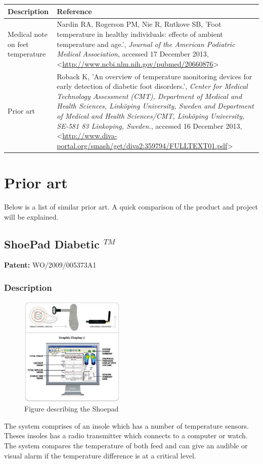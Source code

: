 \begin{table}[H]
\centering
\begin{tabular}{|p{4cm}|p{10cm}|}
\hline
Description & Reference\\ \hline
Medical note on feet temperature&Nardin RA, Rogerson PM, Nie R, Rutkove SB, 'Foot temperature in healthy individuals: effects of ambient temperature and age.', \textit{Journal of the American Podiatric Medical Association}, accessed 17 December 2013, <\url{http://www.ncbi.nlm.nih.gov/pubmed/20660876}>\\ \hline
Prior art &Roback K, 'An overview of temperature monitoring devices for early detection of diabetic foot disorders.', \textit{Center for Medical Technology Assessment (CMT), Department of Medical and Health Sciences, Linköping University, Sweden and Department of Medical and Health Sciences/CMT, Linköping University, SE-581 83 Linkoping, Sweden.}, accessed 16 December 2013, <\url{http://www.diva-portal.org/smash/get/diva2:359794/FULLTEXT01.pdf}> \\ \hline
\end{tabular}
\end{table}

\section{Prior art}
Below is a list of similar prior art. A quick comparison of the product and project will be explained.
\subsection{ShoePad Diabetic $^{TM}$}
\textbf{Patent:} WO/2009/005373A1\\
\subsubsection{Description}
\begin{figure}
\includegraphics[width=5cm]{billeder/shoepad}
\caption{Figure describing the Shoepad}
\end{figure}
The system comprises of an insole which has a number of temperature sensors. Theses insoles has a radio transmitter which connects to a computer or watch. The system compares the temperature of both feed and can give an audible or visual alarm if the temperature difference is at a critical level.
